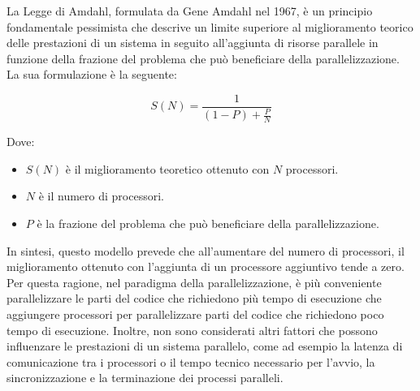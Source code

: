 La Legge di Amdahl, formulata da Gene Amdahl nel 1967, è un principio
fondamentale pessimista che descrive un limite superiore al miglioramento
teorico delle prestazioni di un sistema in seguito all'aggiunta di risorse
parallele in funzione della frazione del problema che può beneficiare della
parallelizzazione. La sua formulazione è la seguente:

\begin{equation}
  S(N) = \frac{1}{(1 - P) + \frac{P}{N}}
\end{equation}

Dove:
\begin{itemize}
  \item $S(N)$ è il miglioramento teoretico ottenuto con $N$ processori.

  \item $N$ è il numero di processori.

  \item $P$ è la frazione del problema che può beneficiare della parallelizzazione.
\end{itemize}

In sintesi, questo modello prevede che all'aumentare del numero di processori,
il miglioramento ottenuto con l'aggiunta di un processore aggiuntivo tende a
zero. Per questa ragione, nel paradigma della parallelizzazione, è più conveniente
parallelizzare le parti del codice che richiedono più tempo di esecuzione che aggiungere
processori per parallelizzare parti del codice che richiedono poco tempo di esecuzione.
Inoltre, non sono considerati altri fattori che possono influenzare le prestazioni
di un sistema parallelo, come ad esempio la latenza di comunicazione tra i
processori o il tempo tecnico necessario per l'avvio, la sincronizzazione e la terminazione
dei processi paralleli.
